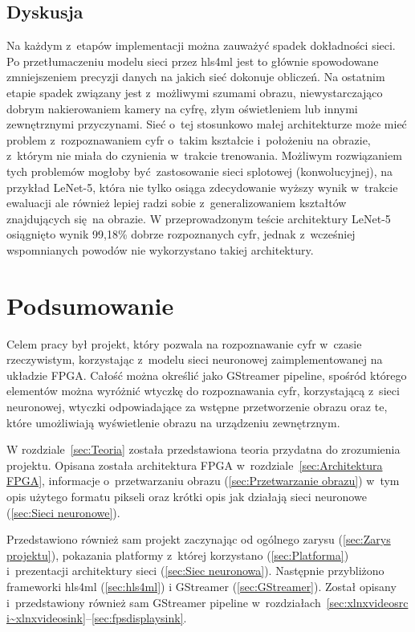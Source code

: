 \documentclass[12pt, oneside, a4paper]{article}
\begin{document}
\subsection{Dyskusja}\label{sec:Dyskusja}
Na każdym z~etapów implementacji można zauważyć spadek dokładności sieci.
\linebreak
Po przetłumaczeniu modelu sieci przez hls4ml jest to głównie spowodowane
zmniejszeniem precyzji danych na jakich sieć dokonuje obliczeń. 
Na ostatnim etapie spadek związany jest z~możliwymi szumami obrazu,
niewystarczająco dobrym nakierowaniem kamery na cyfrę, złym oświetleniem lub
innymi zewnętrznymi przyczynami. Sieć o~tej stosunkowo małej architekturze
może mieć problem z~rozpoznawaniem cyfr o~takim kształcie i~położeniu
na obrazie, z~którym nie miała do czynienia w~trakcie trenowania.
Możliwym rozwiązaniem tych problemów mogłoby być zastosowanie sieci
splotowej (konwolucyjnej), na przykład \mbox{LeNet-5}, która nie tylko
osiąga zdecydowanie wyższy wynik w~trakcie ewaluacji ale również lepiej
radzi sobie z~generalizowaniem kształtów znajdujących się na obrazie.
W przeprowadzonym teście architektury \mbox{LeNet-5} osiągnięto wynik
99,18\% dobrze rozpoznanych cyfr, jednak z~wcześniej
wspomnianych powodów nie wykorzystano takiej architektury.


\newpage
{}
\section*{Podsumowanie}
%
Celem pracy był projekt, który pozwala na
rozpoznawanie cyfr w~czasie rzeczywistym, korzystając z~modelu sieci
neuronowej zaimplementowanej na układzie FPGA. Całość można określić jako
GStreamer pipeline, spośród którego elementów można wyróżnić wtyczkę
do rozpoznawania cyfr, korzystającą z~sieci neuronowej, wtyczki odpowiadające
za wstępne przetworzenie obrazu oraz te, które umożliwiają wyświetlenie obrazu
na urządzeniu zewnętrznym.

W rozdziale~\ref{sec:Teoria} została przedstawiona teoria przydatna
do zrozumienia projektu. Opisana została architektura FPGA
w~rozdziale~\ref{sec:Architektura FPGA}, informacje o~przetwarzaniu
obrazu (\ref{sec:Przetwarzanie obrazu}) w~tym opis użytego formatu pikseli
oraz krótki opis jak działają sieci neuronowe (\ref{sec:Sieci neuronowe}).

Przedstawiono również sam projekt zaczynając od ogólnego
zarysu (\ref{sec:Zarys projektu}), pokazania platformy z~której korzystano
(\ref{sec:Platforma}) i~prezentacji architektury sieci (\ref{sec:Siec neuronowa}).
Następnie przybliżono frameworki hls4ml (\ref{sec:hls4ml})
i GStreamer (\ref{sec:GStreamer}). Został opisany i~przedstawiony
również sam GStreamer pipeline
w~rozdziałach~\ref{sec:xlnxvideosrc i~xlnxvideosink}--\ref{sec:fpsdisplaysink}.
\end{document}
